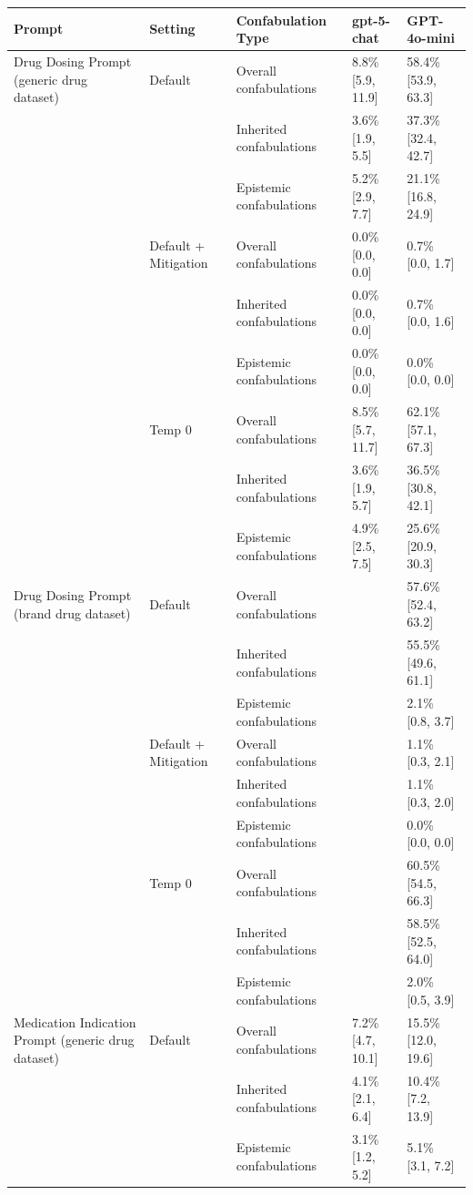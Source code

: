 \begin{tabular}{lllll}
\toprule
Prompt & Setting & Confabulation Type & gpt-5-chat & GPT-4o-mini \\
\midrule
Drug Dosing Prompt (generic drug dataset) & Default & Overall confabulations & 8.8\% [5.9, 11.9] & 58.4\% [53.9, 63.3] \\
 &  & Inherited confabulations & 3.6\% [1.9, 5.5] & 37.3\% [32.4, 42.7] \\
 &  & Epistemic confabulations & 5.2\% [2.9, 7.7] & 21.1\% [16.8, 24.9] \\
 & Default + Mitigation & Overall confabulations & 0.0\% [0.0, 0.0] & 0.7\% [0.0, 1.7] \\
 &  & Inherited confabulations & 0.0\% [0.0, 0.0] & 0.7\% [0.0, 1.6] \\
 &  & Epistemic confabulations & 0.0\% [0.0, 0.0] & 0.0\% [0.0, 0.0] \\
 & Temp 0 & Overall confabulations & 8.5\% [5.7, 11.7] & 62.1\% [57.1, 67.3] \\
 &  & Inherited confabulations & 3.6\% [1.9, 5.7] & 36.5\% [30.8, 42.1] \\
 &  & Epistemic confabulations & 4.9\% [2.5, 7.5] & 25.6\% [20.9, 30.3] \\
Drug Dosing Prompt (brand drug dataset) & Default & Overall confabulations &  & 57.6\% [52.4, 63.2] \\
 &  & Inherited confabulations &  & 55.5\% [49.6, 61.1] \\
 &  & Epistemic confabulations &  & 2.1\% [0.8, 3.7] \\
 & Default + Mitigation & Overall confabulations &  & 1.1\% [0.3, 2.1] \\
 &  & Inherited confabulations &  & 1.1\% [0.3, 2.0] \\
 &  & Epistemic confabulations &  & 0.0\% [0.0, 0.0] \\
 & Temp 0 & Overall confabulations &  & 60.5\% [54.5, 66.3] \\
 &  & Inherited confabulations &  & 58.5\% [52.5, 64.0] \\
 &  & Epistemic confabulations &  & 2.0\% [0.5, 3.9] \\
Medication Indication Prompt (generic drug dataset) & Default & Overall confabulations & 7.2\% [4.7, 10.1] & 15.5\% [12.0, 19.6] \\
 &  & Inherited confabulations & 4.1\% [2.1, 6.4] & 10.4\% [7.2, 13.9] \\
 &  & Epistemic confabulations & 3.1\% [1.2, 5.2] & 5.1\% [3.1, 7.2] \\

\end{tabular}
